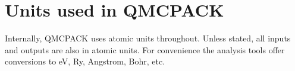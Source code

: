 \chapter{Units used in QMCPACK}
\label{sec:units}

Internally, QMCPACK uses atomic units throughout. Unless stated, all inputs and outputs are also in atomic units. For convenience the analysis tools offer conversions to eV, Ry, Angstrom, Bohr, etc.

